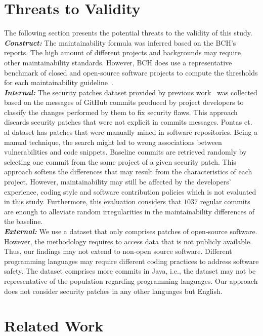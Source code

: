 \documentclass[10pt,conference]{IEEEtran}
\begin{document}
\section{Threats to Validity}\label{sec:threats}
%
The following section presents the potential threats to the validity of this
study.
%
\\\textit{\textbf{Construct:}} The maintainability formula was inferred based on the BCH's reports. The high
amount of different projects and backgrounds may require other
maintainability standards. However, BCH does use a representative benchmark of
closed and open-source software projects to compute the
thresholds for each maintainability guideline~\cite{Visser:2016:OREILLY, Baggen2012}.
%
\\\textit{\textbf{Internal:}} The security patches dataset provided by previous
work~\cite{Reis:2017:IJSSE} was collected based on the messages of GitHub
commits produced by project developers to classify the changes performed by them
to fix security flaws. This approach discards security patches that were
not explicit in commits messages. Pontas et. al\cite{10.1109/MSR.2019.00064} dataset
has patches that were manually mined in software repositories. Being a manual technique,
the search might led to
wrong associations between vulnerabilities and code snippets.
Baseline commits are retrieved randomly by selecting one commit from the same
project of a given security patch. This approach softens the differences
that may result from the characteristics of each project. However,
maintainability may still be affected by the developers' experience, coding
style and software contribution policies which is not evaluated in this study.
Furthermore, this evaluation considers that $1037$ regular commits are enough to
alleviate random irregularities in the maintainability differences of the
baseline.
%
\\\textit{\textbf{External:}} We use a dataset that only comprises patches of open-source software.
However, the methodology requires to access data that is not publicly available.
Thus, our findings may not extend to non-open source software. Different programming 
languages may require different coding practices to address software safety. The 
dataset comprises more commits in Java, i.e., the dataset may not be representative 
of the population regarding programming languages. Our approach does not consider 
security patches in any other languages but English.

\section{Related Work}\label{sec:rw}
\end{document}
